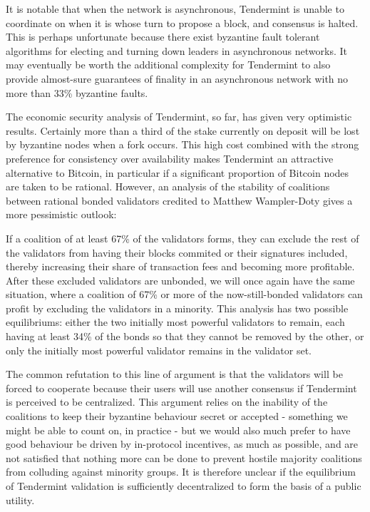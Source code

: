 \documentclass[11pt,a4paper]{article}
\theoremstyle{plain}
\theoremstyle{definition}
\begin{document}
It is notable that when the network is asynchronous, Tendermint is unable to coordinate on when it is whose turn to propose a block, and consensus is halted. This is perhaps unfortunate because there exist byzantine fault tolerant algorithms for electing and turning down leaders in asynchronous networks. It may eventually be worth the additional complexity for Tendermint to also provide almost-sure guarantees of finality in an asynchronous network with no more than 33\% byzantine faults.

The economic security analysis of Tendermint, so far, has given very optimistic results. Certainly more than a third of the stake currently on deposit will be lost by byzantine nodes when a fork occurs. This high cost combined with the strong preference for consistency over availability makes Tendermint an attractive alternative to Bitcoin, in particular if a significant proportion of Bitcoin nodes are taken to be rational. However, an analysis of the stability of coalitions between rational bonded validators credited to Matthew Wampler-Doty gives a more pessimistic outlook:

If a coalition of at least 67\% of the validators forms, they can exclude the rest of the validators from having their blocks commited or their signatures included, thereby increasing their share of transaction fees and becoming more profitable. After these excluded validators are unbonded, we will once again have the same situation, where a coalition of 67\% or more of the now-still-bonded validators can profit by excluding the validators in a minority. This analysis has two possible equilibriums: either the two initially most powerful validators to remain, each having at least 34\% of the bonds so that they cannot be removed by the other, or only the initially most powerful validator remains in the validator set. 

The common refutation to this line of argument is that the validators will be forced to cooperate because their users will use another consensus if Tendermint is perceived to be centralized. This argument relies on the inability of the coalitions to keep their byzantine behaviour secret or accepted - something we might be able to count on, in practice - but we would also much prefer to have good behaviour be driven by in-protocol incentives, as much as possible, and are not satisfied that nothing more can be done to prevent hostile majority coalitions from colluding against minority groups. It is therefore unclear if the equilibrium of Tendermint validation is sufficiently decentralized to form the basis of a public utility.
\end{document}

